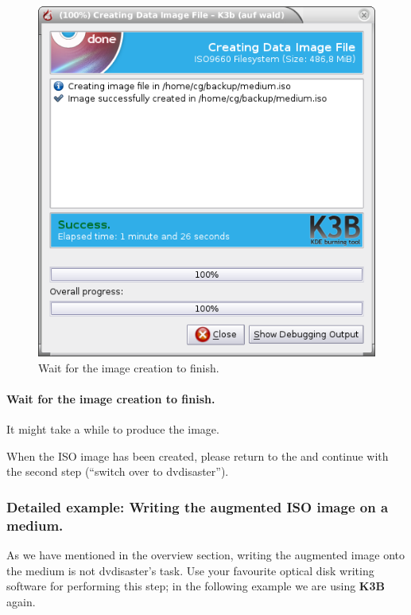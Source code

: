 \newpage
\begin{figure}[h]
\centerline{\includegraphics[width=\textwidth]{screenshots/make-iso6.png}}
\caption{Wait for the image creation to finish.}  
\label{howto-augment-make-iso-create}
\end{figure}

\paragraph{Wait for the image creation to finish.} It
might take a while to produce the image.

\bigskip

When the ISO image has been created, please return to
the 
and continue with the second step (``switch over to dvdisaster'').

\newpage
\subsubsection{Detailed example: Writing the augmented ISO image on a medium.}
\label{howto-augment-write-iso}

As we have mentioned in the overview section, writing the augmented image
onto the medium is not dvdisaster's task. Use your favourite optical disk
writing software for performing this step; in the following example
we are using {\bf K3B} again.

